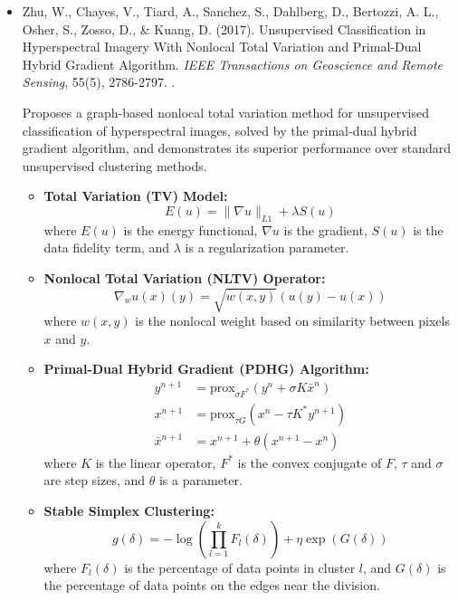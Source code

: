 \documentclass[10pt,svgnames,fragile]{beamer}
\begin{document}
\begin{frame}{}
\tiny
\begin{itemize}

\item Zhu, W., Chayes, V., Tiard, A., Sanchez, S., Dahlberg, D., Bertozzi, A. L., Osher, S., Zosso, D., \& Kuang, D. (2017). Unsupervised Classification in Hyperspectral Imagery With Nonlocal Total Variation and Primal-Dual Hybrid Gradient Algorithm. \textit{IEEE Transactions on Geoscience and Remote Sensing}, 55(5), 2786-2797. \href{https://doi.org/10.1109/TGRS.2017.2654486}{\color{blue}{DOI: 10.1109/TGRS.2017.2654486}}. \cite{zhuUnsupervisedClassificationHyperspectral2017}

{\color{gray}Proposes a graph-based nonlocal total variation method for unsupervised classification of hyperspectral images, solved by the primal-dual hybrid gradient algorithm, and demonstrates its superior performance over standard unsupervised clustering methods.}
\begin{itemize} \tiny
    \item \textbf{Total Variation (TV) Model:}
    \[
    E(u) = \| \nabla u \|_{L1} + \lambda S(u)
    \]
    where \( E(u) \) is the energy functional, \( \nabla u \) is the gradient, \( S(u) \) is the data fidelity term, and \( \lambda \) is a regularization parameter.

    \item \textbf{Nonlocal Total Variation (NLTV) Operator:}
    \[
    \nabla_w u(x)(y) = \sqrt{w(x, y)}(u(y) - u(x))
    \]
    where \( w(x, y) \) is the nonlocal weight based on similarity between pixels \( x \) and \( y \).

    \item \textbf{Primal-Dual Hybrid Gradient (PDHG) Algorithm:}
    \[
    \begin{aligned}
    y^{n+1} &= \text{prox}_{\sigma F^*}(y^n + \sigma K \bar{x}^n) \\
    x^{n+1} &= \text{prox}_{\tau G}(x^n - \tau K^* y^{n+1}) \\
    \bar{x}^{n+1} &= x^{n+1} + \theta (x^{n+1} - x^n)
    \end{aligned}
    \]
    where \( K \) is the linear operator, \( F^* \) is the convex conjugate of \( F \), \( \tau \) and \( \sigma \) are step sizes, and \( \theta \) is a parameter.

    \item \textbf{Stable Simplex Clustering:}
    \[
    g(\delta) = -\log \left( \prod_{l=1}^{k} F_l(\delta) \right) + \eta \exp(G(\delta))
    \]
    where \( F_l(\delta) \) is the percentage of data points in cluster \( l \), and \( G(\delta) \) is the percentage of data points on the edges near the division.
\end{itemize}

\end{itemize}
\end{frame}
\end{document}
